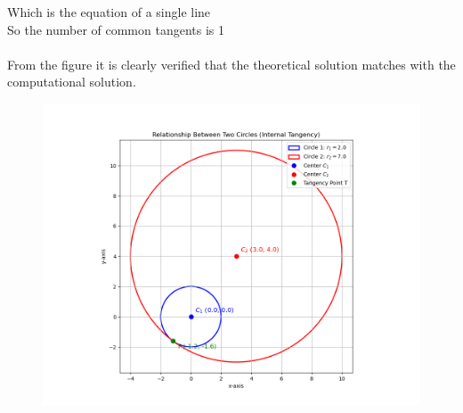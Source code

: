 \documentclass[journal]{IEEEtran}
\theoremstyle{remark}
\begin{document}
Which is the equation of a single line\\
So the number of common tangents is 1\\\\
From the figure it is clearly verified that the theoretical solution matches with the computational solution.\\
\begin{figure}[h]
    \centering
    \includegraphics[height=0.5\textheight, keepaspectratio]{figs/figure1.png}
    \label{figure_1}
\end{figure}
\end{document}
